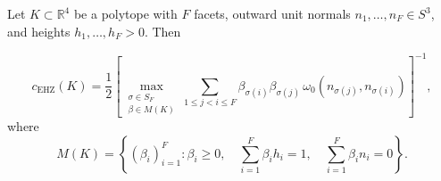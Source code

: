 %
%


\begin{theorem}\label{thm:main}
\begin{sloppypar}
Let $K \subset \mathbb{R}^4$ be a polytope with $F$ facets,
outward unit normals $n_1, \ldots, n_F \in S^3$,
and heights $h_1, \ldots, h_F > 0$.
Then\end{sloppypar}
\begin{equation}\label{eq:ehz-main}
  c_{\mathrm{EHZ}}(K) = \frac{1}{2}
  \left[
    \max_{\substack{
      \sigma \in S_F \\
      \beta \in M(K)
    }}
    \sum_{1 \leq j < i \leq F}
      \beta_{\sigma(i)} \beta_{\sigma(j)} \,
      \omega_0(n_{\sigma(j)}, n_{\sigma(i)})
  \right]^{-1},
\end{equation}
where
\begin{equation}\label{eq:constraint-set}
  M(K) = \left\{
    (\beta_i)_{i=1}^{F} :
    \beta_i \geq 0, \quad  %
    \sum_{i=1}^{F} \beta_i h_i = 1, \quad
    \sum_{i=1}^{F} \beta_i n_i = 0
  \right\}.
\end{equation}
\end{theorem}


